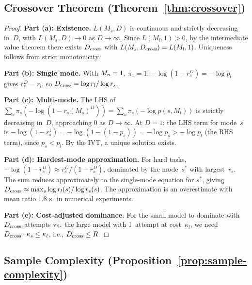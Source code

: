 \subsection{Crossover Theorem (Theorem~\ref{thm:crossover})}
\label{app:crossover}

\begin{proof}
\noindent\textbf{Part (a): Existence.}
$L(M_s, D)$ is continuous and strictly decreasing in~$D$, with $L(M_s, D) \to 0$ as $D \to \infty$.
Since $L(M_l, 1) > 0$, by the intermediate value theorem there exists $D_{\mathrm{cross}}$ with $L(M_s, D_{\mathrm{cross}}) = L(M_l, 1)$.
Uniqueness follows from strict monotonicity.

\noindent\textbf{Part (b): Single mode.}
With $M_n = 1$, $\pi_1 = 1$:
$-\log(1 - r_s^D) = -\log p_l$ gives $r_s^D = r_l$, so $D_{\mathrm{cross}} = \log r_l / \log r_s$.

\noindent\textbf{Part (c): Multi-mode.}
The LHS of $\sum_s \pi_s(-\log(1-r_s(M_s)^D)) = \sum_s \pi_s(-\log p(s,M_l))$ is strictly decreasing in~$D$, approaching $0$ as $D \to \infty$.
At $D = 1$: the LHS term for mode~$s$ is $-\log(1 - r_s^1) = -\log(1-(1-p_s)) = -\log p_s > -\log p_l$ (the RHS term), since $p_s < p_l$.
By the IVT, a unique solution exists.

\noindent\textbf{Part (d): Hardest-mode approximation.}
For hard tasks, $-\log(1-r_s^D) \approx r_s^D/(1-r_s^D)$, dominated by the mode~$s^*$ with largest~$r_s$.
The sum reduces approximately to the single-mode equation for $s^*$, giving $D_{\mathrm{cross}} \approx \max_s \log r_l(s)/\log r_s(s)$.
The approximation is an overestimate with mean ratio $1.8\times$ in numerical experiments.

\noindent\textbf{Part (e): Cost-adjusted dominance.}
For the small model to dominate with $D_{\mathrm{cross}}$ attempts vs.\ the large model with 1~attempt at cost~$\kappa_l$, we need $D_{\mathrm{cross}} \cdot \kappa_s \le \kappa_l$, i.e., $D_{\mathrm{cross}} \le R$.
\end{proof}

\subsection{Sample Complexity (Proposition~\ref{prop:sample-complexity})}
\label{app:sample-complexity}

